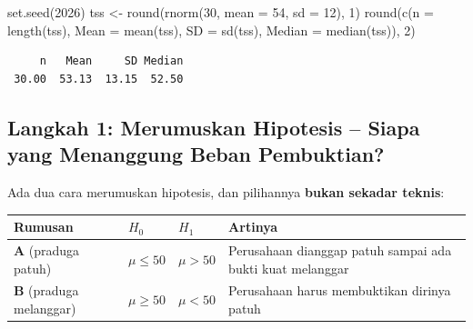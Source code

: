\documentclass[
  indonesian,
  letterpaper,
]{book}
\newenvironment{Shaded}{\begin{snugshade}}{\end{snugshade}}
\newcommand{\AttributeTok}[1]{\textcolor[rgb]{0.40,0.45,0.13}{#1}}
\newcommand{\DecValTok}[1]{\textcolor[rgb]{0.68,0.00,0.00}{#1}}
\newcommand{\FunctionTok}[1]{\textcolor[rgb]{0.28,0.35,0.67}{#1}}
\newcommand{\NormalTok}[1]{\textcolor[rgb]{0.00,0.23,0.31}{#1}}
\newcommand{\OtherTok}[1]{\textcolor[rgb]{0.00,0.23,0.31}{#1}}
\newcounter{none} %
\begin{document}
\begin{Shaded}
\begin{Highlighting}[]
\FunctionTok{set.seed}\NormalTok{(}\DecValTok{2026}\NormalTok{)}
\NormalTok{tss }\OtherTok{\textless{}{-}} \FunctionTok{round}\NormalTok{(}\FunctionTok{rnorm}\NormalTok{(}\DecValTok{30}\NormalTok{, }\AttributeTok{mean =} \DecValTok{54}\NormalTok{, }\AttributeTok{sd =} \DecValTok{12}\NormalTok{), }\DecValTok{1}\NormalTok{)}
\FunctionTok{round}\NormalTok{(}\FunctionTok{c}\NormalTok{(}\AttributeTok{n =} \FunctionTok{length}\NormalTok{(tss), }\AttributeTok{Mean =} \FunctionTok{mean}\NormalTok{(tss), }\AttributeTok{SD =} \FunctionTok{sd}\NormalTok{(tss), }\AttributeTok{Median =} \FunctionTok{median}\NormalTok{(tss)), }\DecValTok{2}\NormalTok{)}
\end{Highlighting}
\end{Shaded}

\begin{verbatim}
     n   Mean     SD Median 
 30.00  53.13  13.15  52.50 
\end{verbatim}

\subsection{Langkah 1: Merumuskan Hipotesis -- Siapa yang Menanggung
Beban
Pembuktian?}\label{langkah-1-merumuskan-hipotesis-siapa-yang-menanggung-beban-pembuktian}

Ada dua cara merumuskan hipotesis, dan pilihannya \textbf{bukan sekadar
teknis}:

{\def\LTcaptype{none} %
\begin{longtable}[]{@{}
  >{\raggedright\arraybackslash}p{}
  >{\raggedright\arraybackslash}p{}
  >{\raggedright\arraybackslash}p{}
  >{\raggedright\arraybackslash}p{}@{}}
\toprule\noalign{}
\begin{minipage}[b]{\linewidth}\raggedright
Rumusan
\end{minipage} & \begin{minipage}[b]{\linewidth}\raggedright
\(H_0\)
\end{minipage} & \begin{minipage}[b]{\linewidth}\raggedright
\(H_1\)
\end{minipage} & \begin{minipage}[b]{\linewidth}\raggedright
Artinya
\end{minipage} \\
\midrule\noalign{}
\endhead
\bottomrule\noalign{}
\endlastfoot
\textbf{A} (praduga patuh) & \(\mu \leq 50\) & \(\mu > 50\) & Perusahaan
dianggap patuh sampai ada bukti kuat melanggar \\
\textbf{B} (praduga melanggar) & \(\mu \geq 50\) & \(\mu < 50\) &
Perusahaan harus membuktikan dirinya patuh \\
\end{longtable}
}
\end{document}
